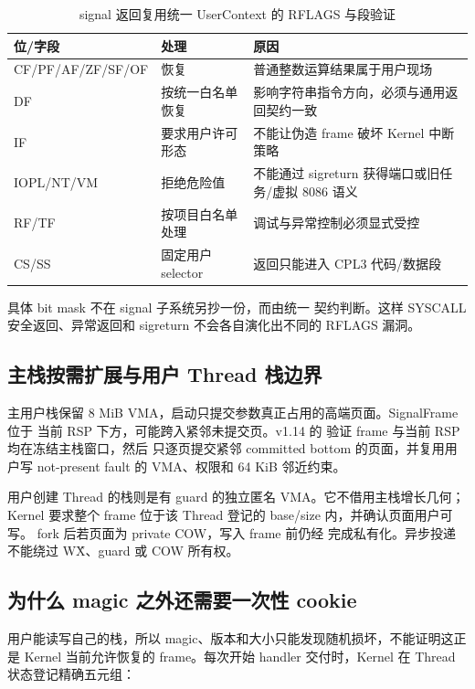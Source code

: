 \begin{table}[htbp]
\centering
\small
\begin{tabularx}{\textwidth}{l l X}
\toprule
位/字段 & 处理 & 原因\\
\midrule
CF/PF/AF/ZF/SF/OF & 恢复 & 普通整数运算结果属于用户现场\\
DF & 按统一白名单恢复 & 影响字符串指令方向，必须与通用返回契约一致\\
IF & 要求用户许可形态 & 不能让伪造 frame 破坏 Kernel 中断策略\\
IOPL/NT/VM & 拒绝危险值 & 不能通过 sigreturn 获得端口或旧任务/虚拟 8086 语义\\
RF/TF & 按项目白名单处理 & 调试与异常控制必须显式受控\\
CS/SS & 固定用户 selector & 返回只能进入 CPL3 代码/数据段\\
\bottomrule
\end{tabularx}
\caption{signal 返回复用统一 UserContext 的 RFLAGS 与段验证}
\end{table}

具体 bit mask 不在 signal 子系统另抄一份，而由统一
 契约判断。这样 SYSCALL 安全返回、异常返回和
sigreturn 不会各自演化出不同的 RFLAGS 漏洞。

\subsection{主栈按需扩展与用户 Thread 栈边界}

主用户栈保留 8 MiB VMA，启动只提交参数真正占用的高端页面。SignalFrame 位于
当前 RSP 下方，可能跨入紧邻未提交页。v1.14 的
 验证 frame 与当前 RSP 均在冻结主栈窗口，然后
只逐页提交紧邻 committed bottom 的页面，并复用用户写 not-present fault 的
VMA、权限和 64 KiB 邻近约束。

用户创建 Thread 的栈则是有 guard 的独立匿名 VMA。它不借用主栈增长几何；
Kernel 要求整个 frame 位于该 Thread 登记的 base/size 内，并确认页面用户可写。
fork 后若页面为 private COW，写入 frame 前仍经
 完成私有化。异步投递不能绕过 W\^X、guard
或 COW 所有权。

\subsection{为什么 magic 之外还需要一次性 cookie}

用户能读写自己的栈，所以 magic、版本和大小只能发现随机损坏，不能证明这正是
Kernel 当前允许恢复的 frame。每次开始 handler 交付时，Kernel 在 Thread
状态登记精确五元组：


